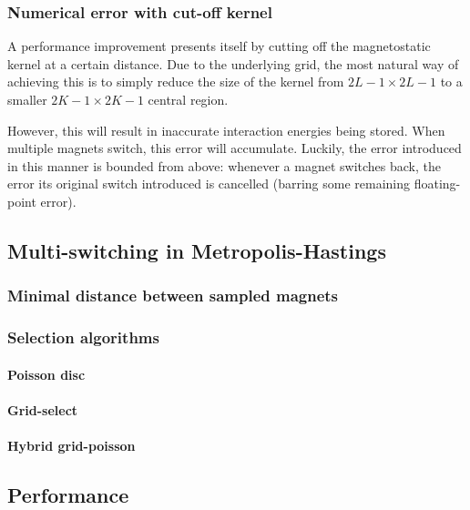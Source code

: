 \subsubsection{Numerical error with cut-off kernel} %
A performance improvement presents itself by cutting off the magnetostatic kernel at a certain distance.
Due to the underlying grid, the most natural way of achieving this is to simply reduce the size of the kernel from $2L-1 \times 2L-1$ to a smaller $2K-1 \times 2K-1$ central region. \par %
However, this will result in inaccurate interaction energies being stored.
When multiple magnets switch, this error will accumulate.
Luckily, the error introduced in this manner is bounded from above: whenever a magnet switches back, the error its original switch introduced is cancelled (barring some remaining floating-point error).

\subsection{Multi-switching in Metropolis-Hastings} \label{sec:2:MultiSwitch} %
\subsubsection{Minimal distance between sampled magnets} %
\subsubsection{Selection algorithms}
\paragraph{Poisson disc}
\paragraph{Grid-select}
\paragraph{Hybrid grid-poisson}

\subsection{Performance} %
